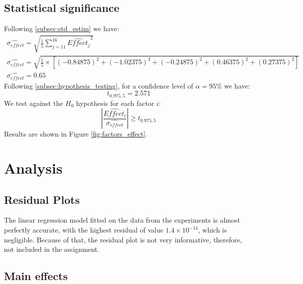 \documentclass{article}
\begin{document}
\subsection{Statistical significance}
\label{subsec:statistical_significance}

Following \ref{subsec:std_estim} we have:
\begin{gather}
    \widehat{\sigma_{effect}} = \sqrt{\frac{1}{5} \sum_{j=11}^{16} \widehat{Effect_j}^2} \\
    \widehat{\sigma_{effect}} = \sqrt{\frac{1}{5}\times\left[
            \left(-0.84875\right)^2
            + \left(-1.02375\right)^2
            + \left(-0.24875\right)^2
            + \left(0.46375\right)^2
            + \left(0.27375\right)^2
            \right]}                                                                             \\
    \widehat{\sigma_{effect}} = 0.65
\end{gather}
Following \ref{subsec:hypothesis_testing}, for a confidence level of $\alpha=95\%$ we have:
\begin{equation}
    t_{0.975, 5} = 2.571
\end{equation}
We test against the $H_0$ hypothesis for each factor $i$:
\begin{equation}
    \left| \frac{\widehat{Effect_i}}{\widehat{\sigma_{effect}}} \right| \geq t_{0.975, 5}
\end{equation}
Results are shown in Figure \ref{fig:factors_effect}.

\section{Analysis}

\subsection{Residual Plots}
The linear regression model fitted on the data from the experiments is almost perfectly accurate, with the highest residual of value $1.4\times10^{-14}$, which is negligible. Because of that, the residual plot is not very informative, therefore, not included in the assignment.

\subsection{Main effects}
\end{document}

